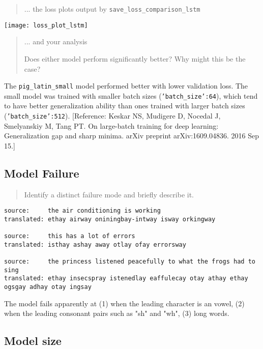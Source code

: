 \documentclass{article}
\begin{document}
\begin{quote}
... the loss plots output by \texttt{save\_loss\_comparison\_lstm}
\end{quote}

\texttt{[image: loss\_plot\_lstm]}

\begin{quote}
... and your analysis

Does  either  model perform significantly better?  Why might this be the case?
\end{quote}

The \texttt{pig\_latin\_small} model performed better with lower validation loss. The small model was trained with smaller batch sizes (\texttt{'batch\_size':64}), which tend to have better generalization ability than ones trained with larger batch sizes (\texttt{'batch\_size':512}). [Reference: Keskar NS, Mudigere D, Nocedal J, Smelyanskiy M, Tang PT. On large-batch training for deep learning: Generalization gap and sharp minima. arXiv preprint arXiv:1609.04836. 2016 Sep 15.]



\subsection*{Model Failure}

\begin{quote}
Identify a distinct failure mode and briefly describe it.
\end{quote}

\begin{lstlisting}
source:		the air conditioning is working 
translated:	ethay airway oniningbay-intway isway orkingway

source:		this has a lot of errors 
translated:	isthay ashay away otlay ofay errorsway

source:		the princess listened peacefully to what the frogs had to sing 
translated:	ethay insecspray istenedlay eaffulecay otay athay ethay ogsgay adhay otay ingsay
\end{lstlisting}

The model fails apparently at (1) when the leading character is an vowel, (2) when the leading consonant pairs such as "sh" and "wh", (3) long words. %


\subsection*{Model size}
\end{document}
